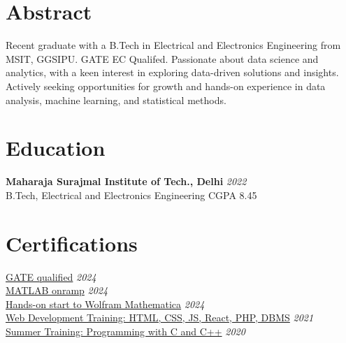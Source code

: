 \documentclass[12pt]{article}
\newcommand{\entry}[4]{{{\textbf{#1}}} \hfill \textit{#3} \\ {\footnotesize #2 \hfill #4} \\}
\newcommand{\display}[3]{\footnotesize \href {#2}{#1} \hfill \textit{#3} \\}
\begin{document}
\begin{paracol}{2}
\switchcolumn


\section{Abstract}
  \footnotesize {Recent graduate with a B.Tech in Electrical and Electronics Engineering from MSIT, GGSIPU. GATE EC Qualifed. Passionate about data science and analytics, with a keen interest in exploring data-driven solutions and insights. Actively seeking opportunities for growth and hands-on experience in data analysis, machine learning, and statistical methods.} 




\section{Education}

\entry{Maharaja Surajmal Institute of Tech., Delhi}{B.Tech, Electrical and Electronics Engineering}{2022}{CGPA 8.45}



\section{Certifications}
\display{GATE qualified}{https://drive.google.com/file/d/1shcvrExVXRHoQDvvzEtomb_LwSz4b1zZ/view?usp=sharing}{2024}
\display{MATLAB onramp}{https://drive.google.com/file/d/1mkDalK8A1keLxXXYWNhQnshTT9sq1vor/view?usp=sharing}{2024}
\display{Hands-on start to Wolfram Mathematica}{https://drive.google.com/file/d/1UMcH0YTn9qbdHo8LIr4tHWEiZi-Xrejt/view?usp=sharing}{2024}
\display{Web Development Training: HTML, CSS, JS, React, PHP, DBMS}{https://drive.google.com/file/d/1BNM1FAxmFkPRrkxTPHEAF5gk_rhXNg5g/view?usp=sharing}{2021}
\display{Summer Training: Programming with C and C++}{https://drive.google.com/file/d/190HRy9cnmwrG0kCt_TeKr5rngykm1PkW/view?usp=sharing}{2020}



\end{paracol}
\end{document}
